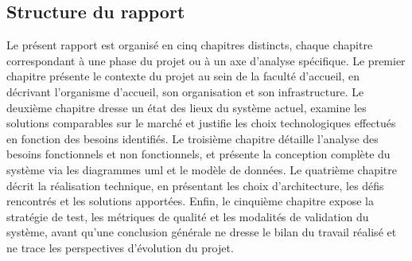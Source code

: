 \subsection*{Structure du rapport}
\label{intro:structure}

Le présent rapport est organisé en cinq chapitres distincts, chaque chapitre correspondant à une phase du projet ou à un axe d'analyse spécifique. Le premier chapitre présente le contexte du projet au sein de la faculté d'accueil, en décrivant l'organisme d'accueil, son organisation et son infrastructure. Le deuxième chapitre dresse un état des lieux du système actuel, examine les solutions comparables sur le marché et justifie les choix technologiques effectués en fonction des besoins identifiés. Le troisième chapitre détaille l'analyse des besoins fonctionnels et non fonctionnels, et présente la conception complète du système via les diagrammes \acrshort{uml} et le modèle de données. Le quatrième chapitre décrit la réalisation technique, en présentant les choix d'architecture, les défis rencontrés et les solutions apportées. Enfin, le cinquième chapitre expose la stratégie de test, les métriques de qualité et les modalités de validation du système, avant qu'une conclusion générale ne dresse le bilan du travail réalisé et ne trace les perspectives d'évolution du projet.
